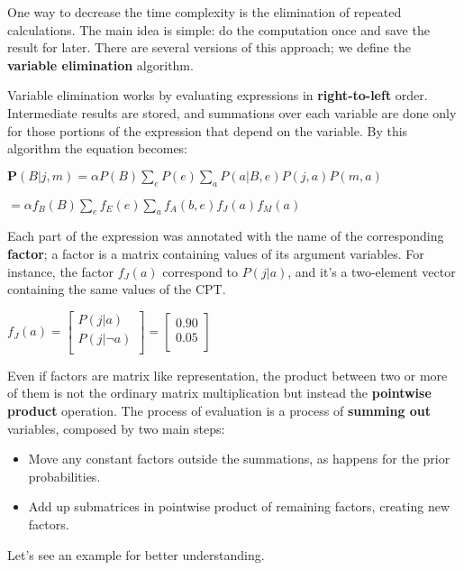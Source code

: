 One way to decrease the time complexity is the elimination of repeated calculations. The main idea is simple: do the computation once and save the result for later.
There are several versions of this approach; we define the \textbf{variable elimination} algorithm. \vspace{3.5pt}

Variable elimination works by evaluating expressions in \textbf{right-to-left} order. Intermediate results are stored, and summations over each variable are done only for 
those portions of the expression that depend on the variable. By this algorithm the equation becomes:
\begin{center}
    $\mathbf{P}(B|j, m) = \alpha P(B) \sum_{e} P(e) \sum_{a} P(a|B, e) P(j, a) P(m, a)$

    $=\alpha f_B(B) \sum_{e} f_E(e) \sum_{a} f_A(b, e) f_J(a) f_M(a)$
\end{center}
Each part of the expression was annotated with the name of the corresponding \textbf{factor}; a factor is a matrix containing values of its argument variables.
For instance, the factor $f_J(a)$ correspond to $P(j|a)$, and it's a two-element vector containing the same values of the CPT.
\begin{center}
    $f_J(a) = 
        \begin{bmatrix}
            P(j|a) \\ 
            P(j|\neg a) \\ 
        \end{bmatrix}
    = 
        \begin{bmatrix}
            0.90 \\ 
            0.05 \\ 
        \end{bmatrix}
    $
\end{center}
Even if factors are matrix like representation, the product between two or more of them is not the ordinary matrix multiplication but instead the \textbf{pointwise product} operation.
The process of evaluation is a process of \textbf{summing out} variables, composed by two main steps:
\begin{itemize}
    \renewcommand{\labelitemi}{-}
    \item Move any constant factors outside the summations, as happens for the prior probabilities.
    \item Add up submatrices in pointwise product of remaining factors, creating new factors.
\end{itemize}
Let's see an example for better understanding.
